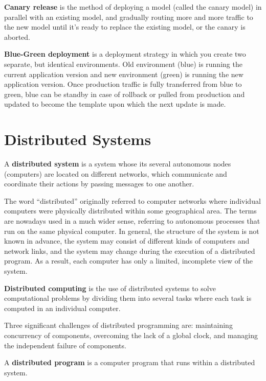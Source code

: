\textbf{Canary release} is the method of deploying a model (called the canary model) in parallel with an existing model,
and gradually routing more and more traffic to the new model until it's ready to replace the existing model, or the
canary is aborted.
\ed

\textbf{Blue-Green deployment} is a deployment strategy in which you create two separate, but identical environments.
Old environment (blue) is running the current application version and new environment (green) is running the new
application version. Once production traffic is fully transferred from blue to green, blue can be standby in case of
rollback or pulled from production and updated to become the template upon which the next update is made.
\ed

\section{Distributed Systems}

A \textbf{distributed system} is a system whose its several autonomous nodes (computers) are located on different
networks, which communicate and coordinate their actions by passing messages to one another.
\ed

The word ``distributed'' originally referred to computer networks where individual computers were physically
distributed within some geographical area. The terms are nowadays used in a much wider sense, referring to autonomous
processes that run on the same physical computer. In general, the structure of the system is not known in advance,
the system may consist of different kinds of computers and network links, and the system may change during the
execution of a distributed program. As a result, each computer has only a limited, incomplete view of the system.

\textbf{Distributed computing} is the use of distributed systems to solve computational problems by dividing them
into several tasks where each task is computed in an individual computer.
\ed

Three significant challenges of distributed programming are: maintaining concurrency of components, overcoming the lack
of a global clock, and managing the independent failure of components.

A \textbf{distributed program} is a computer program that runs within a distributed system.
\ed

